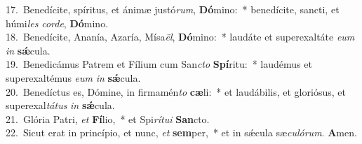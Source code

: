 {17.~}Benedícite, spíritus, et ánimæ justó\textit{rum}, \textbf{Dó}mino:~* benedícite, sancti, et húmi\textit{les} \textit{cor}\textit{de}, \textbf{Dó}mino.\\
{18.~}Benedícite, Ananía, Azaría, Mísa\textit{ël}, \textbf{Dó}mino:~* laudáte et superexaltáte \textit{e}\textit{um} \textit{in} \textbf{sǽ}cula.\\
{19.~}Benedicámus Patrem et Fílium cum San\textit{cto} \textbf{Spí}ritu:~* laudémus et superexaltémus \textit{e}\textit{um} \textit{in} \textbf{sǽ}cula.\\
{20.~}Benedíctus es, Dómine, in firmamén\textit{to} \textbf{cæ}li:~* et laudábilis, et gloriósus, et superexal\textit{tá}\textit{tus} \textit{in} \textbf{sǽ}cula.\\
{21.~}Glória Patri, \textit{et} \textbf{Fí}lio,~* et Spi\textit{rí}\textit{tu}\textit{i} \textbf{San}cto.\\
{22.~}Sicut erat in princípio, et nunc, \textit{et} \textbf{sem}per,~* et in sǽcula sæ\textit{cu}\textit{ló}\textit{rum}. \textbf{A}men.\\
